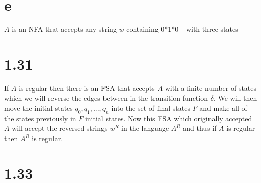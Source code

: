 \documentclass{article}
\begin{document}
\newpage
\section*{e}
$A$ is an NFA that accepts any string $w$ containing 0*1*0+ with three states

\begin{center}
\end{center}

\section*{1.31}

If $A$ is regular then there is an FSA that accepts $A$ with a finite number of states which we will reverse the edges between in the transition function $\delta$. We will then move the initial states $q_0,q_1,...,q_n$ into the set of final states $F$ and make all of the states previously in $F$ initial states. Now this FSA which originally accepted $A$ will accept the reversed strings $w^R$ in the language $A^R$ and thus if $A$ is regular then $A^R$ is regular. 

\section*{1.33}
\end{document}
